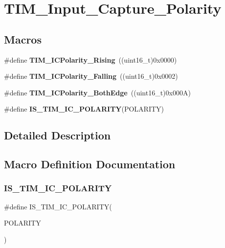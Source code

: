 \section{T\+I\+M\+\_\+\+Input\+\_\+\+Capture\+\_\+\+Polarity}
\label{group__TIM__Input__Capture__Polarity}
\subsection*{Macros}
\begin{DoxyCompactItemize}
\item 
\#define \textbf{ T\+I\+M\+\_\+\+I\+C\+Polarity\+\_\+\+Rising}~((uint16\+\_\+t)0x0000)
\item 
\#define \textbf{ T\+I\+M\+\_\+\+I\+C\+Polarity\+\_\+\+Falling}~((uint16\+\_\+t)0x0002)
\item 
\#define \textbf{ T\+I\+M\+\_\+\+I\+C\+Polarity\+\_\+\+Both\+Edge}~((uint16\+\_\+t)0x000\+A)
\item 
\#define \textbf{ I\+S\+\_\+\+T\+I\+M\+\_\+\+I\+C\+\_\+\+P\+O\+L\+A\+R\+I\+TY}(P\+O\+L\+A\+R\+I\+TY)
\end{DoxyCompactItemize}


\subsection{Detailed Description}


\subsection{Macro Definition Documentation}
\mbox{\label{group__TIM__Input__Capture__Polarity_ga6aff2fe442fd9662a0bb8731134cda89}} 
\subsubsection{I\+S\+\_\+\+T\+I\+M\+\_\+\+I\+C\+\_\+\+P\+O\+L\+A\+R\+I\+TY}
{\footnotesize\ttfamily \#define I\+S\+\_\+\+T\+I\+M\+\_\+\+I\+C\+\_\+\+P\+O\+L\+A\+R\+I\+TY(\begin{DoxyParamCaption}\item[{}]{P\+O\+L\+A\+R\+I\+TY }\end{DoxyParamCaption})}

